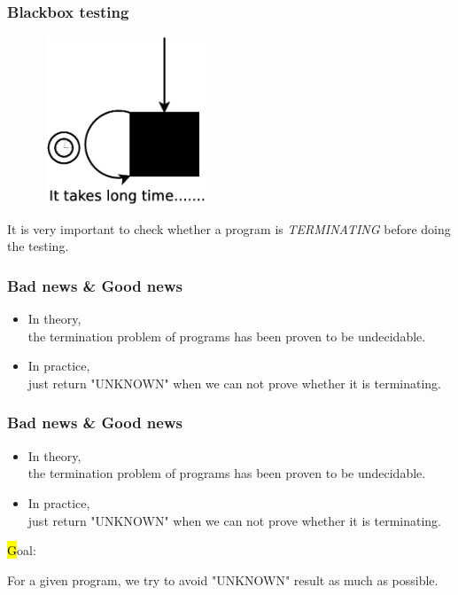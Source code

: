 \begin{frame}
\frametitle{Blackbox testing}
\begin{minipage}{\linewidth}
\begin{figure}  %
  \includegraphics[width=5cm,height = 5cm]{pictures/blackbox}  
\end{figure}
\end{minipage}
\vfill
\begin{minipage}{\linewidth}
It is very important to check whether a program is \emph{\red TERMINATING} before doing the testing.
\end{minipage}
\end{frame}
\fi

\begin{frame}
\frametitle{Bad news \& Good news}
\begin{itemize}
\item In theory, \\ the termination problem of programs has been proven to be undecidable.
\item In practice, \\ just return "UNKNOWN" when we can not prove whether it is terminating.

\end{itemize}
\end{frame}

\begin{frame}
\frametitle{Bad news \& Good news}
\begin{itemize}
\item In theory, \\ the termination problem of programs has been proven to be undecidable.
\item In practice, \\ just return "UNKNOWN" when we can not prove whether it is terminating.
\end{itemize}
\hl

Goal:

\quad  For a given program, we try to avoid "UNKNOWN" result as much as possible.
\end{frame}

